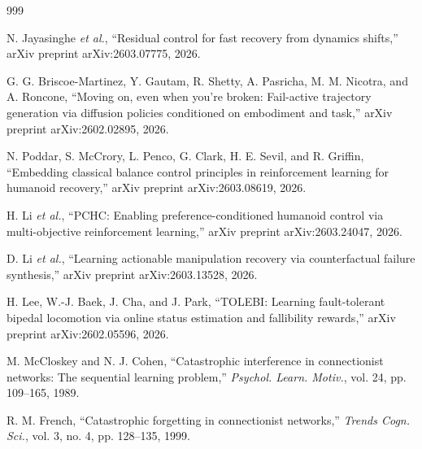 \documentclass[12pt,a4paper,oneside]{report}
\begin{document}
\begin{thebibliography}{999}

N. Jayasinghe \textit{et al.}, ``Residual control for fast recovery from dynamics shifts,'' arXiv preprint arXiv:2603.07775, 2026.




G. G. Briscoe-Martinez, Y. Gautam, R. Shetty, A. Pasricha, M. M. Nicotra, and A. Roncone, ``Moving on, even when you're broken: Fail-active trajectory generation via diffusion policies conditioned on embodiment and task,'' arXiv preprint arXiv:2602.02895, 2026.




N. Poddar, S. McCrory, L. Penco, G. Clark, H. E. Sevil, and R. Griffin, ``Embedding classical balance control principles in reinforcement learning for humanoid recovery,'' arXiv preprint arXiv:2603.08619, 2026.




H. Li \textit{et al.}, ``{PCHC}: Enabling preference-conditioned humanoid control via multi-objective reinforcement learning,'' arXiv preprint arXiv:2603.24047, 2026.




D. Li \textit{et al.}, ``Learning actionable manipulation recovery via counterfactual failure synthesis,'' arXiv preprint arXiv:2603.13528, 2026.




H. Lee, W.-J. Baek, J. Cha, and J. Park, ``{TOLEBI}: Learning fault-tolerant bipedal locomotion via online status estimation and fallibility rewards,'' arXiv preprint arXiv:2602.05596, 2026.




M. McCloskey and N. J. Cohen, ``Catastrophic interference in connectionist networks: The sequential learning problem,'' \textit{Psychol. Learn. Motiv.}, vol. 24, pp. 109--165, 1989.




R. M. French, ``Catastrophic forgetting in connectionist networks,'' \textit{Trends Cogn. Sci.}, vol. 3, no. 4, pp. 128--135, 1999.




\end{thebibliography}
\end{document}
